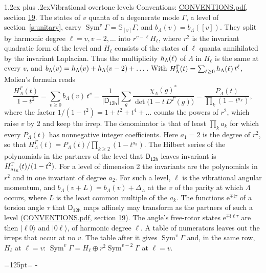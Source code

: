 \documentclass[10pt,a4paper]{article}
\makeatletter
\renewcommand\section{\@startsection{section}{1}{\z@}{-3ex plus -1ex minus -.2ex}%
  {1.2ex plus .2ex}{\normalfont\large\sffamily\bfseries\color{parttitle}}}
\newcommand{\needspace}[1]{\par\penalty-100\begingroup\dimen0=#1\relax\dimen2=\pagegoal
  \advance\dimen2-\pagetotal\ifdim\dimen0>\dimen2\relax\ifdim\dimen2>0pt\vfil\break\fi\fi
  \endgroup}
\numberwithin{equation}{section}
\newcommand{\grp}[1]{\mathsf{#1}}
\newcommand{\irr}[1]{\text{\normalfont\scshape #1}}
\newcommand{\ptag}[1]{\mathrm{#1}}
\newcommand{\iunit}{\mathrm{i}}
\newcommand{\expe}{\mathrm{e}}
\newcommand{\repD}[1]{D^{#1}}
\newcommand{\irchar}[1]{\chi_{#1}}
\newcommand{\conj}[1]{{#1}^{*}}
\newcommand{\schur}[1]{\mathbb{S}_{#1}}
\newcommand{\shape}[1]{[#1]}
\newcommand{\occ}[1]{\lvert #1\rangle}
\makeatother
\begin{document}
\section{Vibrational overtone levels}\label{s:overtones}
Conventions: \href{../../CONVENTIONS.pdf}{CONVENTIONS.pdf}, section \href{../../CONVENTIONS.pdf\#conv.19}{19}.
\leavevmode\label{n:index.quanta}\label{n:operator.symmetric.power}The states of $v$ quanta of a degenerate mode $\Gamma$, a level of section~\ref{s:unitary}, carry $\operatorname{Sym}^{v}\Gamma = \schur{\shape{v}}\Gamma$, and $b_\Lambda(v) = b_\Lambda(\shape{v})$. \label{n:local.quadratic.form}\label{n:set.harmonic}They split by harmonic degree $\ell = v, v - 2, \dots$ into $r^{v-\ell}H_\ell$, where $r^2$ is the invariant quadratic form of the level and $H_\ell$ consists of the states of $\ell$ quanta annihilated by the invariant Laplacian. \label{n:function.multiplicity.harmonic}Thus the multiplicity $\mathnormal{h}_\Lambda(\ell)$ of $\Lambda$ in $H_\ell$ is the same at every $v$, and $b_\Lambda(v) = \mathnormal{h}_\Lambda(v) + \mathnormal{h}_\Lambda(v - 2) + \dots$. \label{n:function.generating.level}With $H^{\Gamma}_\Lambda(t) = \sum_{\ell\ge0} \mathnormal{h}_\Lambda(\ell)\,t^{\ell}$, Molien's formula reads
\begin{equation}\label{e:molien}\frac{H^{\Gamma}_\Lambda(t)}{1 - t^2} = \sum_{v\ge0} b_\Lambda(v)\,t^v = \frac{1}{|\grp{D_{12h}}|}\sum_{g}\frac{\conj{\irchar{\Lambda}(g)}}{\det\bigl(1 - t\,\repD{\Gamma}(g)\bigr)} = \frac{P_\Lambda(t)}{\prod_k (1-t^{a_k})},\end{equation}
where the factor $1/(1 - t^2) = 1 + t^2 + t^4 + \dots$ counts the powers of $r^2$, which raise $v$ by 2 and keep the irrep. The denominator is that of least $\prod_k a_k$ for which every $P_\Lambda(t)$ has nonnegative integer coefficients. Here $a_1 = 2$ is the degree of $r^2$, so that $H^{\Gamma}_\Lambda(t) = P_\Lambda(t)/\prod_{k\ge2}(1 - t^{a_k})$. The Hilbert series of the polynomials in the partners of the level that $\grp{D_{12h}}$ leaves invariant is $H^{\Gamma}_{\irr{a}_{1\ptag{g}}}(t)/(1 - t^2)$. For a level of dimension 2 the invariants are the polynomials in $r^2$ and in one invariant of degree $a_2$. \label{n:index.overtone.period}\label{n:index.increment.unitary}For such a level, $\ell$ is the vibrational angular momentum, and $b_\Lambda(v + L) = b_\Lambda(v) + \Delta_\Lambda$ at the $v$ of the parity at which $\Lambda$ occurs, where $L$ is the least common multiple of the $a_k$. \label{n:local.torsion.angle}The functions $\expe^{\mp\iunit\tau}$ of a torsion angle $\tau$ that $\grp{D_{12h}}$ maps affinely may transform as the partners of such a level (\href{../../CONVENTIONS.pdf}{CONVENTIONS.pdf}, section \href{../../CONVENTIONS.pdf\#conv.19}{19}). The angle's free-rotor states $\expe^{\mp\iunit\ell\tau}$ are then $\occ{\ell 0}$ and $\occ{0 \ell}$, of harmonic degree $\ell$. A table of numerators leaves out the irreps that occur at no $v$. The table after it gives $\operatorname{Sym}^{v}\Gamma$ and, in the same row, $H_\ell$ at $\ell = v$: $\operatorname{Sym}^{v}\Gamma = H_\ell \oplus r^2\operatorname{Sym}^{v-2}\Gamma$ at $\ell = v$.
\needspace{125pt}
\end{document}
